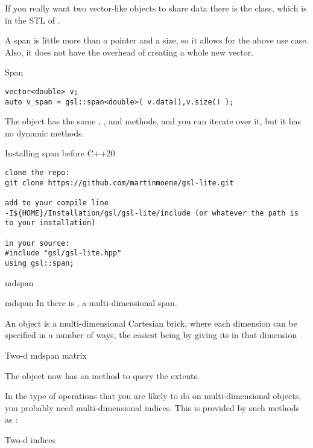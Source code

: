 If you really want two vector-like objects to share data there is the
 class, which is in the \ac{STL} of .

A span is little more than a pointer and a size, so it allows for the
above use case. Also, it does not have the overhead of creating a
whole new vector.

\begin{block}{Span}
  \label{sl:spandef}
\begin{lstlisting}
vector<double> v;
auto v_span = gsl::span<double>( v.data(),v.size() );
\end{lstlisting}
The  object has the same , , and
 methods, and you can iterate over it, but it has no
dynamic methods.
\end{block}

 {Installing span before C++20}

\begin{verbatim}
clone the repo: 
git clone https://github.com/martinmoene/gsl-lite.git

add to your compile line 
-I${HOME}/Installation/gsl/gsl-lite/include (or whatever the path is to your installation)

in your source:
#include "gsl/gsl-lite.hpp"
using gsl::span;
\end{verbatim}

 {mdspan}

\begin{plainblock}{mdspan}
  In  there is ,
  a multi-dimensional span.
\end{plainblock}

An  object is a multi-dimensional Cartesian brick,
where each dimension can be specified in a number of ways,
the easiest being by giving its  in that dimension

\begin{block}{Two-d mdspan matrix}
\end{block}

The object now has an  method to query the extents.

In the type of operations that you are likely to do on multi-dimensional objects,
you probably need multi-dimensional indices.
This is provided by such methods as :

\begin{block}{Two-d indices}
\end{block}


